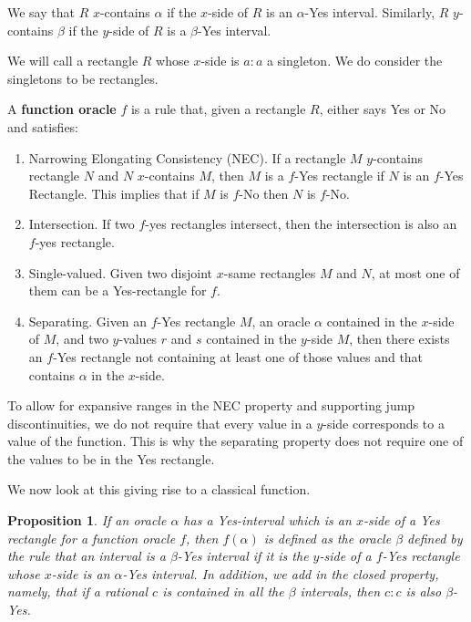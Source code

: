 \documentclass[12pt]{article}
\newtheorem{proposition}{Proposition}
\theoremstyle{remark}
\begin{document}
We say that $R$ $x$-contains $\alpha$ if the $x$-side of $R$ is an $\alpha$-Yes interval. Similarly, $R$ $y$-contains $\beta$ if the $y$-side of $R$ is a $\beta$-Yes interval.

We will call a rectangle $R$ whose $x$-side is $a:a$ a singleton. We do consider the singletons to be rectangles.

A \textbf{function oracle} $f$ is a rule that, given a rectangle $R$, either says Yes or No and satisfies: 
\begin{enumerate}
    \item Narrowing Elongating Consistency (NEC). If a rectangle $M$ $y$-contains rectangle $N$ and $N$ $x$-contains $M$, then $M$ is a $f$-Yes rectangle if $N$  is an $f$-Yes Rectangle. This implies that if $M$ is $f$-No then $N$ is $f$-No.
    \item Intersection. If two $f$-yes rectangles intersect, then the intersection is also an $f$-yes rectangle. 
    \item Single-valued. Given two disjoint $x$-same rectangles $M$ and $N$, at most one of them can be a Yes-rectangle for $f$. 
    \item Separating. Given an $f$-Yes rectangle $M$, an oracle $\alpha$ contained in the $x$-side of $M$, and two $y$-values $r$ and $s$ contained in the $y$-side $M$, then there exists an $f$-Yes rectangle not containing at least one of those values and that contains $\alpha$ in the $x$-side.
\end{enumerate} 

To allow for expansive ranges in the NEC property and supporting jump discontinuities, we do not require that every value in a $y$-side corresponds to a value of the function. This is why the separating property does not require one of the values to be in the Yes rectangle. 

We now look at this giving rise to a classical function. 

\begin{proposition}
If an oracle $\alpha$ has a Yes-interval which is an $x$-side of a Yes rectangle for a function oracle $f$, then $f(\alpha)$ is defined as the oracle $\beta$ defined by the rule that an interval is a $\beta$-Yes interval if it is the $y$-side of a $f$-Yes rectangle whose $x$-side is an $\alpha$-Yes interval. In addition, we add in the closed property, namely, that if a rational $c$ is contained in all the $\beta$ intervals, then $c:c$ is also $\beta$-Yes.  
\end{proposition}
\end{document}
